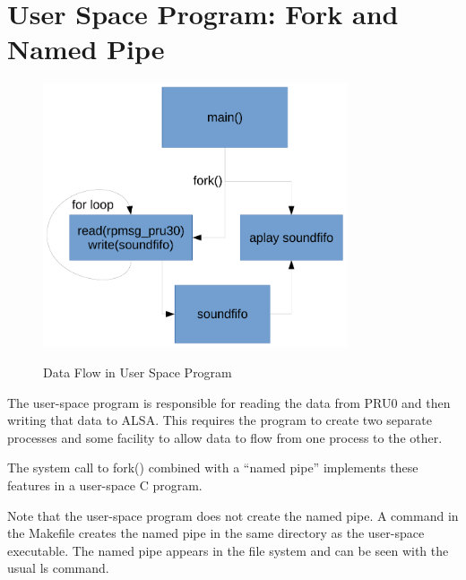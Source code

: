%
%
%

\chapter{User Space Program: Fork and Named Pipe}

	\begin{figure}[h]
		\centering
		\includegraphics[width=0.8\textwidth]{diagrams/fork-crop}
		\centering\bfseries
		\caption{Data Flow in User Space Program}
	\end{figure}
	
	
	The user-space program is responsible for reading the data from PRU0 and then writing that data to ALSA.
	This requires the program to create two separate processes and some facility to allow data to flow from one process to the other.
	
	The system call to fork() combined with a ``named pipe'' implements these features in a user-space C program.
	
	Note that the user-space program does not create the named pipe.  A command in the Makefile creates the named pipe in the same directory as the user-space executable.  The named pipe appears in the file system and can be seen with the usual ls command.